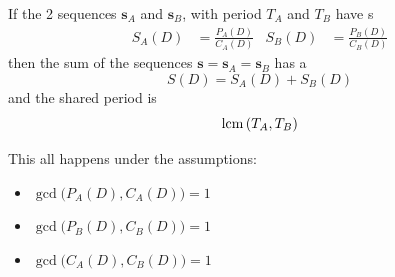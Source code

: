 \begin{theorem}\label{thm:Adding_D_Transform_Sequence}
  If the 2 sequences $\mathbf{s}_{A}$ and $\mathbf{s}_{B}$, with period $T_{A}$ and $T_{B}$ have s
  \begin{align*}
    S_{A}(D) &= \frac{P_{A}(D)}{C_{A}(D)} & S_{B}(D) &= \frac{P_{B}(D)}{C_{B}(D)}
  \end{align*}
  then the sum of the sequences $\mathbf{s} = \mathbf{s}_{A} = \mathbf{s}_{B}$ has a 
  \begin{equation}\label{eq:Add_D_Transform_Sequences}
    S(D) = S_{A}(D) + S_{B}(D)
  \end{equation}
  and the shared period is
  \begin{equation}\label{eq:Period_Add_D_Transform_Sequences}
    \operatorname{\operatorname{lcm}} \left( T_{A}, T_{B} \right)
  \end{equation}

  This all happens under the assumptions:
  \begin{itemize}[noitemsep]
  \item $\gcd \bigl( P_{A}(D), C_{A}(D) \bigr) = 1$
  \item $\gcd \bigl( P_{B}(D), C_{B}(D) \bigr) = 1$
  \item $\gcd \bigl( C_{A}(D), C_{B}(D) \bigr) = 1$
  \end{itemize}
\end{theorem}

